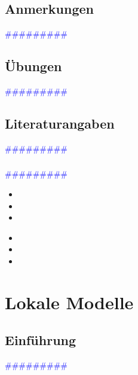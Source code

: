 \documentclass{article}
\begin{document}
  \subsection{Anmerkungen} %
      \textcolor{blue}{\#\#\#\#\#\#\#\#\#}
  \subsection{Übungen} %
      \textcolor{blue}{\#\#\#\#\#\#\#\#\#}
  \subsection{Literaturangaben} %
      \textcolor{blue}{\#\#\#\#\#\#\#\#\#}
    \subsubsection{} %
      \textcolor{blue}{\#\#\#\#\#\#\#\#\#}

      \begin{itemize}
      \color{red}
        \item 
        \item
        \item
      \end{itemize}


      \begin{itemize}
      \color{ForestGreen}
        \item 
        \item
        \item
      \end{itemize}




\newpage
\section{Lokale Modelle} %
  \subsection{Einführung} %
      \textcolor{blue}{\#\#\#\#\#\#\#\#\#}
\end{document}
